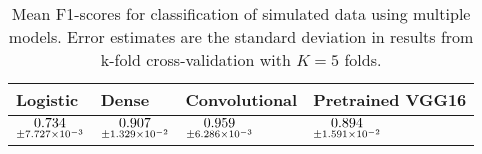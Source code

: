 \begin{table}
\centering
\caption{
Mean F1-scores for classification of simulated data using multiple models. 
Error estimates are the standard deviation in results from k-fold cross-validation 
with $K=5$ folds.
}
\label{tab:classification-simulated-f1}
\begin{tabular}{llll}
\toprule
                                           Logistic &                                               Dense &                                       Convolutional &                                    Pretrained VGG16 \\
\midrule
 $\underset{\num{+- 7.727e-03 }  }{\num{ 0.734 } }$ &  $\underset{\num{+- 1.329e-02 }  }{\num{ 0.907 } }$ &  $\underset{\num{+- 6.286e-03 }  }{\num{ 0.959 } }$ &  $\underset{\num{+- 1.591e-02 }  }{\num{ 0.894 } }$ \\
\bottomrule
\end{tabular}
\end{table}
